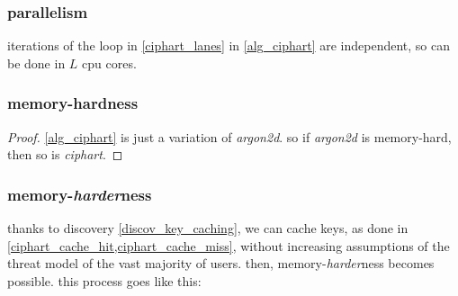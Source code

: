 \documentclass[twocolumn]{article}
\begin{document}
\subsubsection{parallelism}
iterations of the loop in \cref{ciphart_lanes} in \cref{alg_ciphart}
are independent, so can be done in $L$ cpu cores.

\subsubsection{memory-hardness}
\begin{proof}
    \cref{alg_ciphart} is just a variation of \emph{argon2d}.  so if
    \emph{argon2d} is memory-hard, then so is \emph{ciphart}.
\end{proof}


\subsubsection{memory-\emph{harder}ness}
thanks to discovery \ref{discov_key_caching}, we can cache keys, as done in
\cref{ciphart_cache_hit,ciphart_cache_miss}, without increasing assumptions
of the threat model of the vast majority of users.  then,
memory-\emph{harder}ness becomes possible.  this process goes like this:
\end{document}
